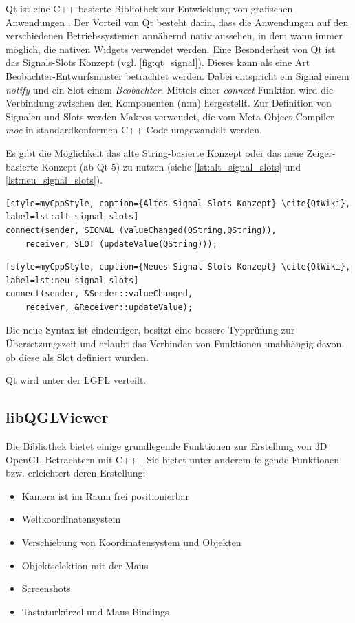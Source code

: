 Qt ist eine C++ basierte Bibliothek zur Entwicklung von grafischen Anwendungen \cite{Qt}. 
Der Vorteil von Qt besteht darin, dass die Anwendungen auf den verschiedenen Betriebssystemen annähernd nativ aussehen, in dem wann immer möglich, die nativen Widgets verwendet werden.
Eine Besonderheit von Qt ist das Signals-Slots Konzept (vgl. \autoref{fig:qt_signal}). 
Dieses kann als eine Art Beobachter-Entwurfsmuster betrachtet werden.
Dabei entspricht ein Signal einem \emph{notify} und ein Slot einem \emph{Beobachter}. 
Mittels einer \emph{connect} Funktion wird die Verbindung zwischen den Komponenten (n:m) hergestellt.
Zur Definition von Signalen und Slots werden Makros verwendet, die vom Meta-Object-Compiler \emph{moc} in standardkonformen C++ Code umgewandelt werden.

Es gibt die Möglichkeit das alte String-basierte Konzept oder das neue Zeiger-basierte Konzept (ab Qt 5) zu nutzen (siehe \autoref{lst:alt_signal_slots} und \autoref{lst:neu_signal_slots}).

\begin{lstlisting}[style=myCppStyle, caption={Altes Signal-Slots Konzept} \cite{QtWiki}, label=lst:alt_signal_slots]
connect(sender, SIGNAL (valueChanged(QString,QString)), 
	receiver, SLOT (updateValue(QString)));
\end{lstlisting}

\begin{lstlisting}[style=myCppStyle, caption={Neues Signal-Slots Konzept} \cite{QtWiki}, label=lst:neu_signal_slots]
connect(sender, &Sender::valueChanged, 
	receiver, &Receiver::updateValue);
\end{lstlisting}

Die neue Syntax ist eindeutiger, besitzt eine bessere Typprüfung zur Übersetzungszeit und erlaubt das Verbinden von Funktionen unabhängig davon, ob diese als Slot definiert wurden.

Qt wird unter der LGPL verteilt.

\subsection{libQGLViewer} 

Die Bibliothek bietet einige grundlegende Funktionen zur Erstellung von 3D OpenGL Betrachtern mit C++ \cite{libQGLViewer}.
Sie bietet unter anderem folgende Funktionen bzw. erleichtert deren Erstellung:

\begin{itemize}
\item Kamera ist im Raum frei positionierbar 
\item Weltkoordinatensystem
\item Verschiebung von Koordinatensystem und Objekten
\item Objektselektion mit der Maus
\item Screenshots
\item Tastaturkürzel und Maus-Bindings
\end{itemize}


